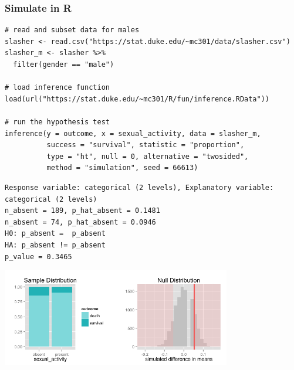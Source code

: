 \documentclass[11pt,containsverbatim,handout,xcolor=xelatex,dvipsnames,table]{beamer}
\begin{document}

\begin{frame}[fragile]
\frametitle{Simulate in R}

\vspace{-0.25cm}

{\tiny
\begin{Verbatim}[frame=single, formatcom=\color{blue}]
# read and subset data for males
slasher <- read.csv("https://stat.duke.edu/~mc301/data/slasher.csv")
slasher_m <- slasher %>%
  filter(gender == "male")
  
# load inference function
load(url("https://stat.duke.edu/~mc301/R/fun/inference.RData"))

# run the hypothesis test
inference(y = outcome, x = sexual_activity, data = slasher_m,
          success = "survival", statistic = "proportion", 
          type = "ht", null = 0, alternative = "twosided", 
          method = "simulation", seed = 66613)
\end{Verbatim}
}

\pause

{\tiny
\begin{Verbatim}[frame=single, formatcom=\color{gray}]
Response variable: categorical (2 levels), Explanatory variable: categorical (2 levels) 
n_absent = 189, p_hat_absent = 0.1481
n_absent = 74, p_hat_absent = 0.0946
H0: p_absent =  p_absent
HA: p_absent != p_absent
p_value = 0.3465
\end{Verbatim}
}

\includegraphics[width=0.75\textwidth]{figures/slasher/male_rand}

\end{frame}


\begin{frame}

\vfill


\vfill

\end{frame}
\end{document}
